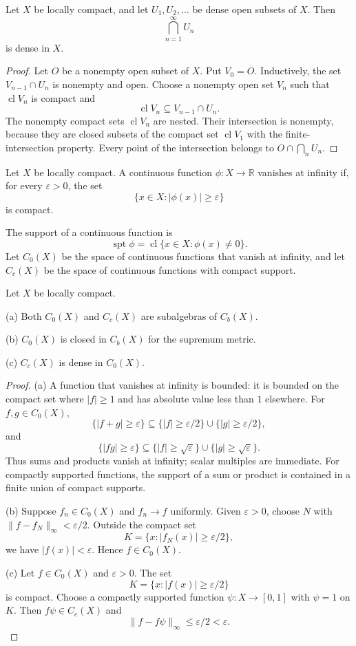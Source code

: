 \begin{thm}
Let $X$ be locally compact, and let $U_1,U_2,\ldots$ be dense open subsets of
$X$. Then
\[
\bigcap_{n=1}^{\infty}U_n
\]
is dense in $X$.
\end{thm}

\begin{proof}
Let $O$ be a nonempty open subset of $X$. Put $V_0=O$. Inductively, the set
$V_{n-1}\cap U_n$ is nonempty and open. Choose a nonempty open set $V_n$ such
that $\operatorname{cl}V_n$ is compact and
\[
\operatorname{cl}V_n\subseteq V_{n-1}\cap U_n.
\]
The nonempty compact sets $\operatorname{cl}V_n$ are nested. Their
intersection is nonempty, because they are closed subsets of the compact set
$\operatorname{cl}V_1$ with the finite-intersection property. Every point of
the intersection belongs to $O\cap\bigcap_nU_n$.
\end{proof}

\begin{de}
Let $X$ be locally compact. A continuous function
$\phi:X\to\mathbb{R}$ vanishes at infinity if, for every $\varepsilon>0$, the
set
\[
\{x\in X:|\phi(x)|\geq\varepsilon\}
\]
is compact.

The support of a continuous function is
\[
\operatorname{spt}\phi
=
\operatorname{cl}\{x\in X:\phi(x)\neq0\}.
\]
Let $C_0(X)$ be the space of continuous functions that vanish at infinity,
and let $C_c(X)$ be the space of continuous functions with compact support.
\end{de}

\begin{thm}
Let $X$ be locally compact.

(a) Both $C_0(X)$ and $C_c(X)$ are subalgebras of $C_b(X)$.

(b) $C_0(X)$ is closed in $C_b(X)$ for the supremum metric.

(c) $C_c(X)$ is dense in $C_0(X)$.
\end{thm}

\begin{proof}
(a) A function that vanishes at infinity is bounded: it is bounded on the
compact set where $|f|\geq1$ and has absolute value less than $1$ elsewhere.
For $f,g\in C_0(X)$,
\[
\{|f+g|\geq\varepsilon\}
\subseteq
\{|f|\geq\varepsilon/2\}\cup\{|g|\geq\varepsilon/2\},
\]
and
\[
\{|fg|\geq\varepsilon\}
\subseteq
\{|f|\geq\sqrt{\varepsilon}\}
\cup
\{|g|\geq\sqrt{\varepsilon}\}.
\]
Thus sums and products vanish at infinity; scalar multiples are immediate.
For compactly supported functions, the support of a sum or product is
contained in a finite union of compact supports.

(b) Suppose $f_n\in C_0(X)$ and $f_n\to f$ uniformly. Given
$\varepsilon>0$, choose $N$ with
$\|f-f_N\|_\infty<\varepsilon/2$. Outside the compact set
\[
K=\{x:|f_N(x)|\geq\varepsilon/2\},
\]
we have $|f(x)|<\varepsilon$. Hence $f\in C_0(X)$.

(c) Let $f\in C_0(X)$ and $\varepsilon>0$. The set
\[
K=\{x:|f(x)|\geq\varepsilon/2\}
\]
is compact. Choose a compactly supported function $\psi:X\to[0,1]$ with
$\psi=1$ on $K$. Then $f\psi\in C_c(X)$ and
\[
\|f-f\psi\|_\infty\leq\varepsilon/2<\varepsilon.
\]
\end{proof}

